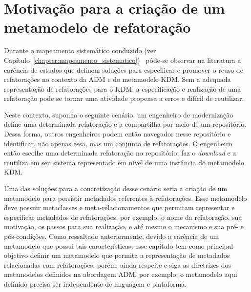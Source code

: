 \section{Motivação para a criação de um metamodelo de refatoração} %
\label{sec:motiva_o_para_a_cria_o_de_um_meta_modelo_de_refatora_o}

Durante o mapeamento sistemático conduzido (ver Capítulo~\ref{chapter:mapeamento_sistematico})~\cite{durelli_systematic_mapping} pôde-se observar na literatura a carência de estudos que definem soluções para especificar e promover o reuso de refatorações no contexto da ADM e do metamodelo KDM. Sem a adequada representação de refatorações para o KDM, a especificação e realização de uma refatoração pode se tornar uma atividade propensa a erros e difícil de reutilizar.

Neste contexto, suponha o seguinte cenário, um engenheiro de modernização define uma determinada refatoração e a compartilha por meio de um repositório. Dessa forma, outros engenheiros podem então navegador nesse repositório e identificar, não apenas essa, mas um conjunto de refatorações. O engenheiro então escolhe uma determinada refatoração no repositório, faz o \textit{download} e a reutiliza em seu sistema representado em nível de uma instância do metamodelo KDM. 

Uma das soluções para a concretização desse cenário seria a criação de um metamodelo para persistir metadados referentes à refatorações. Esse metamodelo deve possuir metaclasses e meta-relacionamentos que permitam representar e especificar metadados de refatorações, por exemplo, o nome da refatoração, sua motivação, os passos para sua realização, e até mesmo o mecanismo e sua pré- e pós-condições. Como ressaltado anteriormente, devido a carência de um metamodelo que possui tais características, esse capítulo tem como principal objetivo definir um metamodelo que permita a representação de metadados relacionadas com refatorações, porém, ainda respeite e siga as diretrizes dos metamodelos definidos na abordagem ADM, por exemplo, o metamodelo aqui definido precisa ser independente de linguagem e plataforma.


